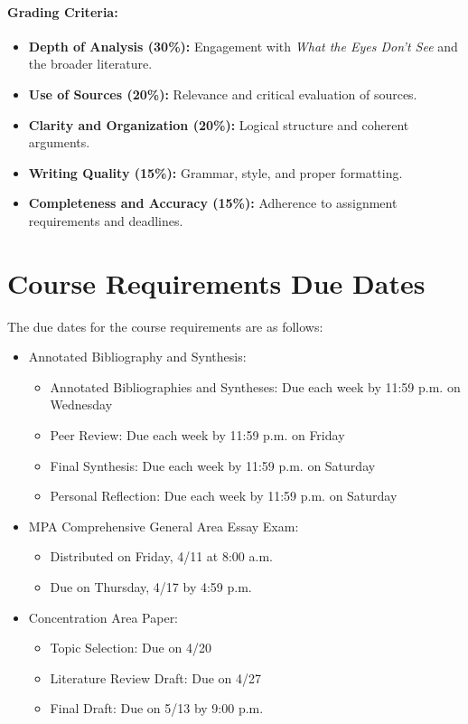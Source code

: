 \documentclass[12pt, letterpaper]{article}
\begin{document}
\paragraph*{Grading Criteria:}
\begin{itemize}
    \item \textbf{Depth of Analysis (30\%):} Engagement with \textit{What the Eyes Don’t See} and the broader literature.
    \item \textbf{Use of Sources (20\%):} Relevance and critical evaluation of sources.
    \item \textbf{Clarity and Organization (20\%):} Logical structure and coherent arguments.
    \item \textbf{Writing Quality (15\%):} Grammar, style, and proper formatting.
    \item \textbf{Completeness and Accuracy (15\%):} Adherence to assignment requirements and deadlines.
\end{itemize}


\section{Course Requirements Due Dates}

The due dates for the course requirements are as follows:
    \begin{itemize}
        \item Annotated Bibliography and Synthesis: 
        \begin{itemize}
            \item Annotated Bibliographies and Syntheses: Due each week by 11:59 p.m. on Wednesday
            \item Peer Review: Due each week by 11:59 p.m. on Friday
            \item Final Synthesis: Due each week by 11:59 p.m. on Saturday
            \item Personal Reflection: Due each week by 11:59 p.m. on Saturday
        \end{itemize}
        \item MPA Comprehensive General Area Essay Exam:
        \begin{itemize}
            \item Distributed on Friday, 4/11 at 8:00 a.m.
            \item Due on Thursday, 4/17 by 4:59 p.m.
        \end{itemize}
        \item Concentration Area Paper:
        \begin{itemize}
            \item Topic Selection: Due on 4/20
            \item Literature Review Draft: Due on 4/27
            \item Final Draft: Due on 5/13 by 9:00 p.m.
        \end{itemize}
    \end{itemize}
\end{document}
